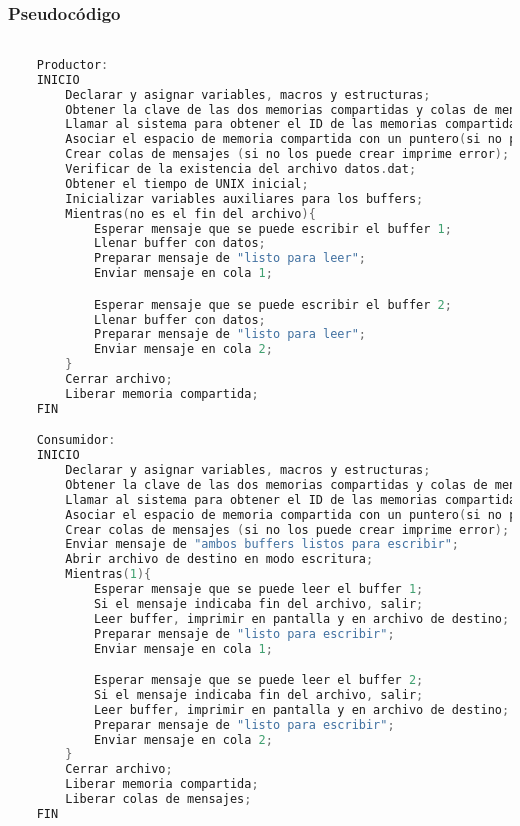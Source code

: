\subsubsection{Pseudocódigo}

\begin{lstlisting}[language=C]          % No usar tildes en el pseudocódigo

    Productor:
    INICIO
        Declarar y asignar variables, macros y estructuras;
        Obtener la clave de las dos memorias compartidas y colas de mensaje (en el caso de que no las obtenga imprime error);
        Llamar al sistema para obtener el ID de las memorias compartidas (en el caso de que no las obtenga imprime error);
        Asociar el espacio de memoria compartida con un puntero(si no puede asociar imprime error);
        Crear colas de mensajes (si no los puede crear imprime error);
        Verificar de la existencia del archivo datos.dat;
        Obtener el tiempo de UNIX inicial;
        Inicializar variables auxiliares para los buffers;
        Mientras(no es el fin del archivo){
            Esperar mensaje que se puede escribir el buffer 1;
            Llenar buffer con datos;
            Preparar mensaje de "listo para leer";
            Enviar mensaje en cola 1;

            Esperar mensaje que se puede escribir el buffer 2;
            Llenar buffer con datos;
            Preparar mensaje de "listo para leer";
            Enviar mensaje en cola 2;
        }
        Cerrar archivo;
        Liberar memoria compartida;
    FIN

    Consumidor:
    INICIO
        Declarar y asignar variables, macros y estructuras;
        Obtener la clave de las dos memorias compartidas y colas de mensaje (en el caso de que no las obtenga imprime error);
        Llamar al sistema para obtener el ID de las memorias compartidas (en el caso de que no las obtenga imprime error);
        Asociar el espacio de memoria compartida con un puntero(si no puede asociar imprime error);
        Crear colas de mensajes (si no los puede crear imprime error);
        Enviar mensaje de "ambos buffers listos para escribir";
        Abrir archivo de destino en modo escritura;
        Mientras(1){
            Esperar mensaje que se puede leer el buffer 1;
            Si el mensaje indicaba fin del archivo, salir;
            Leer buffer, imprimir en pantalla y en archivo de destino;
            Preparar mensaje de "listo para escribir";
            Enviar mensaje en cola 1;

            Esperar mensaje que se puede leer el buffer 2;
            Si el mensaje indicaba fin del archivo, salir;
            Leer buffer, imprimir en pantalla y en archivo de destino;
            Preparar mensaje de "listo para escribir";
            Enviar mensaje en cola 2;
        }
        Cerrar archivo;
        Liberar memoria compartida;
        Liberar colas de mensajes;
    FIN
    
\end{lstlisting}

